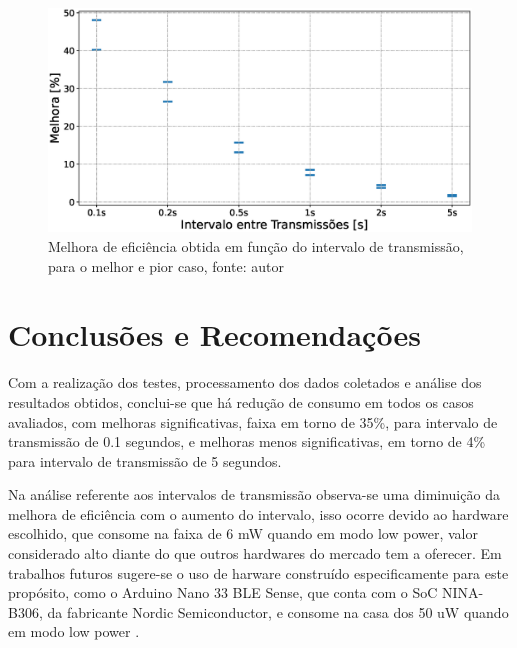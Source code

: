 \documentclass[a5paper]{ufsc-thesis}  %
\begin{document}
\begin{figure}[!h]
    \centering
    \includegraphics[width=1\linewidth]{imagens/compare_intervals.eps}
    \caption{Melhora de eficiência obtida em função do intervalo de transmissão, para o melhor e pior caso, fonte: autor}
    \label{fig:compare_intervals}
\end{figure} 

\chapter{Conclusões e Recomendações}
Com a realização dos testes, processamento dos dados coletados e análise dos resultados obtidos, conclui-se que há redução de consumo em todos os casos avaliados, com melhoras significativas, faixa em torno de 35\%, para intervalo de transmissão de 0.1 segundos, e melhoras menos significativas, em torno de 4\% para intervalo de transmissão de 5 segundos.

Na análise referente aos intervalos de transmissão observa-se uma diminuição da melhora de eficiência com o aumento do intervalo, isso ocorre devido ao hardware escolhido, que consome na faixa de 6 mW quando em modo low power, valor considerado alto diante do que outros hardwares do mercado tem a oferecer. Em trabalhos futuros sugere-se o uso de harware construído especificamente para este propósito, como o Arduino Nano 33 BLE Sense, que conta com o SoC NINA-B306, da fabricante Nordic Semiconductor, e consome na casa dos 50 uW quando em modo low power \cite{nina_module}. 

\end{document}
